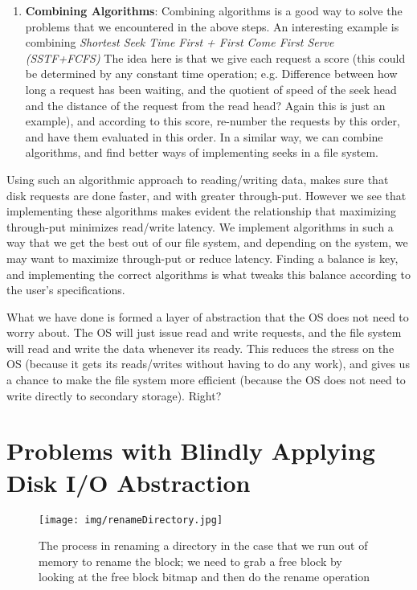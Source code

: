 \documentclass[a4paper]{article}
\begin{document}
\begin{enumerate}
\begin{enumerate}
\item \textbf{Combining Algorithms}: Combining algorithms is a good way to solve the problems that we encountered in the above steps. An interesting example is combining \textit{Shortest Seek Time First + First Come First Serve (SSTF+FCFS)} The idea here is that we give each request a score (this could be determined by any constant time operation; e.g. Difference between how long a request has been waiting, and the quotient of speed of the seek head and the distance of the request from the read head? Again this is just an example), and according to this score, re-number the requests by this order, and have them evaluated in this order. In a similar way, we can combine algorithms, and find better ways of implementing seeks in a file system.

\end{enumerate}

Using such an algorithmic approach to reading/writing data, makes sure that disk requests are done faster, and with greater through-put. However we see that implementing these algorithms makes evident the relationship that maximizing through-put minimizes read/write latency. We implement algorithms in such a way that we get the best out of our file system, and depending on the system, we may want to maximize through-put or reduce latency. Finding a balance is key, and implementing the correct algorithms is what tweaks this balance according to the user's specifications. 

\end{enumerate} 

What we have done is formed a layer of abstraction that the OS does not need to worry about. The OS will just issue read and write requests, and the file system will read and write the data whenever its ready. This reduces the stress on the OS (because it gets its reads/writes without having to do any work), and gives us a chance to make the file system more efficient (because the OS does not need to write directly to secondary storage). Right?

\section{Problems with Blindly Applying Disk I/O Abstraction}

\begin{figure}[H]
\centering
\texttt{[image: img/renameDirectory.jpg]}
\caption{\label{fig:RenameData} The process in renaming a directory in the case that we run out of memory to rename the block; we need to grab a free block by looking at the free block bitmap and then do the rename operation}
\end{figure}
\end{document}
